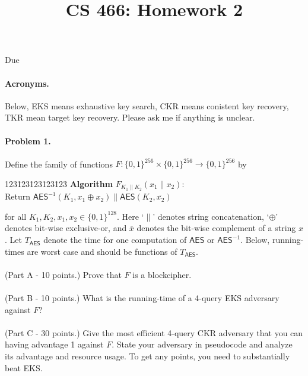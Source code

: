 \documentclass[11pt]{article}
\title{CS 466: Homework 2}
\date{}
\newcommand{\bits}{\{0,1\}}
\begin{document}
\maketitle

\thispagestyle{fancy}

\noindent Due

\paragraph*{Acronyms.} Below,  EKS means exhaustive key search, CKR means conistent key recovery, TKR mean target key recovery.  Please ask me if anything is unclear. 

\paragraph*{Problem 1.} Define the family of functions $F \colon \bits^{256} \times \bits^{256} \to \bits^{256}$ by 
 \begin{center}
\begin{minipage}{1in}
\begin{tabbing}
123\=123\=123\=123\=123\=\kill
\textbf{Algorithm} $F_{K_1 \| K_2}(x_1 \| x_2)$: \\
\> Return $\mathsf{AES}^{-1}(K_1, x_1 \oplus x_2) \| \mathsf{AES}(K_2, \overline{x_2})$
\end{tabbing} \end{minipage}
\end{center}
for all $K_1, K_2, x_1, x_2 \in \bits^{128}$. Here  `$\|$' denotes string concatenation, `$\oplus$' denotes bit-wise exclusive-or, and $\overline{x}$ denotes the bit-wise complement of a string $x$.  Let $T_{\mathsf{AES}}$ denote the time for one computation of $\mathsf{AES}$ or $\mathsf{AES}^{-1}$. Below, running-times are worst case and should be functions of $T_{\mathsf{AES}}$. \\\\
 (Part A - 10 points.) Prove that $F$ is a blockcipher. \\\\
 (Part B - 10 points.) What is the running-time of a 4-query EKS adversary  against $F$? \\\\
 (Part C - 30 points.) Give the most efficient 4-query CKR adversary that you can having advantage 1 against $F$. State your adversary in  pseudocode and  analyze its advantage and resource usage. To get any points, you need to substantially beat EKS.
\end{document}

